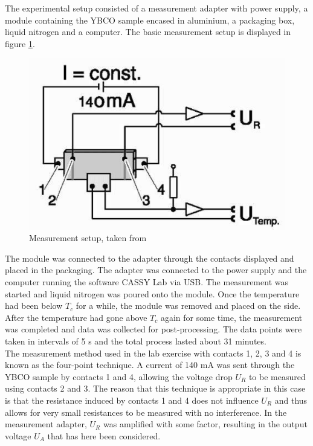 \documentclass[12pt,a4paper]{article}
\begin{document}
The experimental setup consisted of a measurement adapter with power supply, a module containing the YBCO sample encased in aluminium, a packaging box, liquid nitrogen and a computer. The basic measurement setup is displayed in figure \ref{setup}.

\begin{figure}[ht!]
\centering
\includegraphics[scale=0.25]{setup.png}
\caption{Measurement setup, taken from \cite{lab_PM}}
\label{setup}
\end{figure}

The module was connected to the adapter through the contacts displayed and placed in the packaging. The adapter was connected to the power supply and the computer running the software CASSY Lab via USB. The measurement was started and liquid nitrogen was poured onto the module. Once the temperature had been below $T_c$ for a while, the module was removed and placed on the side. After the temperature had gone above $T_c$ again for some time, the measurement was completed and data was collected for post-processing. The data points were taken in intervals of 5 s and the total process lasted about 31 minutes. \\

The measurement method used in the lab exercise with contacts 1, 2, 3 and 4 is known as the four-point technique. A current of 140 mA was sent through the YBCO sample by contacts 1 and 4, allowing the voltage drop $U_R$ to be measured using contacts 2 and 3. The reason that this technique is appropriate in this case is that the resistance induced by contacts 1 and 4 does not influence $U_R$ and thus allows for very small resistances to be measured with no interference. In the measurement adapter, $U_R$ was amplified with some factor, resulting in the output voltage $U_A$ that has here been considered. \\
\end{document}

